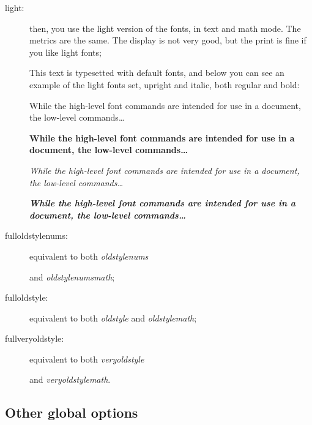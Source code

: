 \documentclass[a4paper,11pt]{christophe}
\begin{document}
\begin{description}
	\item[light:] then, you use the light version of the fonts, in text and math mode. The metrics are the same. 
									The display is not very good, but the print is fine if you like light fonts;
									
									This text is typesetted with default fonts, and below you can see an example of the light fonts set, upright and italic, both regular and bold:\medskip

\hfill\begin{minipage}{11cm}{\selectfont
While the high-level font commands are intended for use in a document, the low-level commands\dots
}\end{minipage}

\smallskip

\hfill\begin{minipage}{11cm}{\selectfont
\textbf{While the high-level font commands are intended for use in a document, the low-level commands\dots}
}\end{minipage}

\smallskip

\hfill\begin{minipage}{11cm}{\selectfont

\textit{While the high-level font commands are intended for use in a document, the low-level commands\dots}
}\end{minipage}

\smallskip


\hfill\begin{minipage}{11cm}{\selectfont
\textbf{\textit{While the high-level font commands are intended for use in a document, the low-level commands\dots}}
}\end{minipage}
	\item[fulloldstylenums:] equivalent to both \textit{oldstylenums}
	
			  and \textit{oldstylenumsmath};
	\item[fulloldstyle:] equivalent to both \textit{oldstyle} and \textit{oldstylemath};
	\item[fullveryoldstyle:] equivalent to both \textit{veryoldstyle} 
				
				and \textit{veryoldstylemath}.
\end{description}

\subsection{Other global options}
\end{document}
